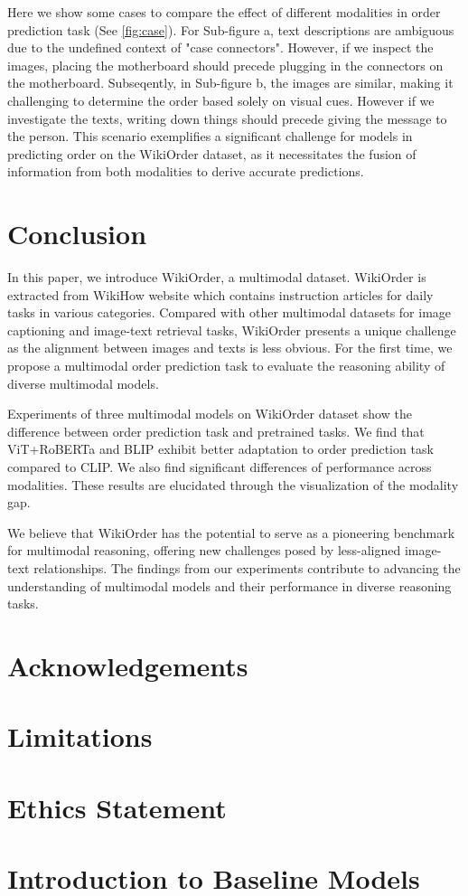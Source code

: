 \documentclass[11pt]{article}
\newcommand{\MY}[1]{\textcolor{orange}{(Mengyue: #1})}
\begin{document}
Here we show some cases to compare the effect of different modalities in order prediction task (See \autoref{fig:case}). For Sub-figure a, text descriptions are ambiguous due to the undefined context of "case connectors". However, if we inspect the images, placing the motherboard should precede plugging in the connectors on the motherboard. Subseqently, in Sub-figure b, the images are similar, making it challenging to determine the order based solely on visual cues. However if we investigate the texts, writing down things should precede giving the message to the person. This scenario exemplifies a significant challenge for models in predicting order on the WikiOrder dataset, as it necessitates the fusion of information from both modalities to derive accurate predictions.


\section{Conclusion}
In this paper, we introduce WikiOrder, a multimodal dataset. WikiOrder is extracted from WikiHow website which contains instruction articles for daily tasks in various categories. Compared with other multimodal datasets for image captioning and image-text retrieval tasks, WikiOrder presents a unique challenge as the alignment between images and texts is less obvious. For the first time, we propose a multimodal order prediction task to evaluate the reasoning ability of diverse multimodal models.

Experiments of three multimodal models on WikiOrder dataset show the difference between order prediction task and pretrained tasks. We find that ViT+RoBERTa and BLIP exhibit better adaptation to order prediction task compared to CLIP. We also find significant differences of performance across modalities. These results are elucidated through the visualization of the modality gap.

We believe that WikiOrder has the potential to serve as a pioneering benchmark for multimodal reasoning, offering new challenges posed by less-aligned image-text relationships. The findings from our experiments contribute to advancing the understanding of multimodal models and their performance in diverse reasoning tasks.


\section*{Acknowledgements}

\section*{Limitations}

\section*{Ethics Statement}


\appendix

\section{Introduction to Baseline Models}
\label{baseline-intro}
\end{document}
